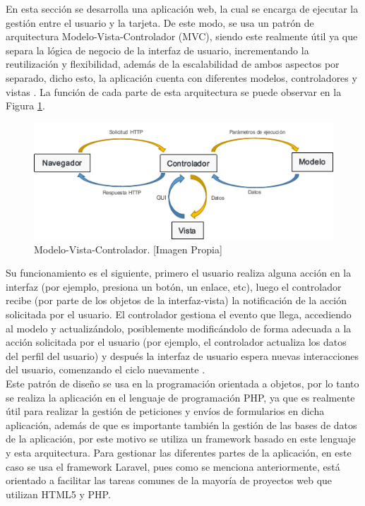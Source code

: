 En esta sección se desarrolla una aplicación web, la cual se encarga de ejecutar la gestión entre el usuario y la tarjeta. De este modo, se usa un patrón de arquitectura Modelo-Vista-Controlador (MVC), siendo este realmente útil ya que separa la lógica de negocio de la interfaz de usuario, incrementando la reutilización y flexibilidad, además de la escalabilidad de ambos aspectos por separado, dicho esto, la aplicación cuenta con diferentes modelos, controladores y vistas \cite{MVC1}. La función de cada parte de esta arquitectura se puede observar en la Figura \ref{fig:mvc}.\\

\begin{figure}[H]
	\centering
	\caption[Modelo-Vista-Controlador.]{Modelo-Vista-Controlador. [Imagen Propia]}
	\label{fig:mvc}
	\includegraphics[width=0.7\linewidth]{Imagenes/MVC}
\end{figure}


Su funcionamiento es el siguiente, primero el usuario realiza alguna acción en la interfaz (por ejemplo, presiona un botón, un enlace, etc), luego el controlador recibe (por parte de los objetos de la interfaz-vista) la notificación de la acción solicitada por el usuario. El controlador gestiona el evento que llega, accediendo al modelo y actualizándolo, posiblemente modificándolo de forma adecuada a la acción solicitada por el usuario (por ejemplo, el controlador actualiza los datos del perfil del usuario) y después la interfaz de usuario espera nuevas interacciones del usuario, comenzando el ciclo nuevamente \cite{MVC2}.\\

Este patrón de diseño se usa en la programación orientada a objetos, por lo tanto se realiza la aplicación en el lenguaje de programación PHP, ya que es realmente útil para realizar la gestión de peticiones y envíos de formularios en dicha aplicación, además de que es importante también la gestión de las bases de datos de la aplicación, por este motivo se utiliza un framework basado en este lenguaje y esta arquitectura. Para gestionar las diferentes partes de la aplicación, en este caso se usa el framework Laravel, pues como se menciona anteriormente, está orientado a facilitar las tareas comunes de la mayoría de proyectos web que utilizan HTML5 y PHP.\\

